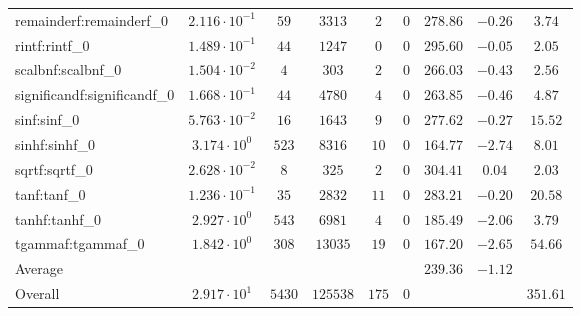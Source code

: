 \begin{tabular}{|l|c|c|c|c|c|c|c|c|}
remainderf:remainderf\_0     & $ 2.116 \cdot 10^{-1} $ & $ 59     $ & $ 3313   $ & $ 2   $ & $ 0   $ & $ 278.86      $ & $ -0.26   $ & $ 3.74    $ \\
rintf:rintf\_0               & $ 1.489 \cdot 10^{-1} $ & $ 44     $ & $ 1247   $ & $ 0   $ & $ 0   $ & $ 295.60      $ & $ -0.05   $ & $ 2.05    $ \\
scalbnf:scalbnf\_0           & $ 1.504 \cdot 10^{-2} $ & $ 4      $ & $ 303    $ & $ 2   $ & $ 0   $ & $ 266.03      $ & $ -0.43   $ & $ 2.56    $ \\
significandf:significandf\_0 & $ 1.668 \cdot 10^{-1} $ & $ 44     $ & $ 4780   $ & $ 4   $ & $ 0   $ & $ 263.85      $ & $ -0.46   $ & $ 4.87    $ \\
sinf:sinf\_0                 & $ 5.763 \cdot 10^{-2} $ & $ 16     $ & $ 1643   $ & $ 9   $ & $ 0   $ & $ 277.62      $ & $ -0.27   $ & $ 15.52   $ \\
sinhf:sinhf\_0               & $ 3.174 \cdot 10^{0}  $ & $ 523    $ & $ 8316   $ & $ 10  $ & $ 0   $ & $ 164.77      $ & $ -2.74   $ & $ 8.01    $ \\
sqrtf:sqrtf\_0               & $ 2.628 \cdot 10^{-2} $ & $ 8      $ & $ 325    $ & $ 2   $ & $ 0   $ & $ 304.41      $ & $ 0.04    $ & $ 2.03    $ \\
tanf:tanf\_0                 & $ 1.236 \cdot 10^{-1} $ & $ 35     $ & $ 2832   $ & $ 11  $ & $ 0   $ & $ 283.21      $ & $ -0.20   $ & $ 20.58   $ \\
tanhf:tanhf\_0               & $ 2.927 \cdot 10^{0}  $ & $ 543    $ & $ 6981   $ & $ 4   $ & $ 0   $ & $ 185.49      $ & $ -2.06   $ & $ 3.79    $ \\
tgammaf:tgammaf\_0           & $ 1.842 \cdot 10^{0}  $ & $ 308    $ & $ 13035  $ & $ 19  $ & $ 0   $ & $ 167.20      $ & $ -2.65   $ & $ 54.66   $ \\
\hline
Average                      & $                     $ & $        $ & $        $ & $     $ & $     $ & $ 239.36      $ & $ -1.12   $ & $         $ \\
\hline
Overall                      & $ 2.917 \cdot 10^{1}  $ & $ 5430   $ & $ 125538 $ & $ 175 $ & $ 0   $ & $             $ & $         $ & $ 351.61  $ \\
\hline
\end{tabular}
